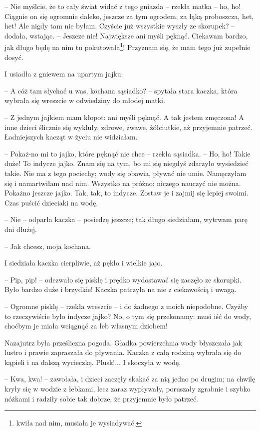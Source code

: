 \documentclass{book}
\begin{document}
-- Nie myślcie, że to cały świat widać z tego gniazda -- rzekła matka -- ho, ho! Ciągnie on się ogromnie daleko, jeszcze za tym ogrodem, za łąką proboszcza, het, het! Ale nigdy tam nie byłam. Czyście już wszystkie wyszły ze skorupek? -- dodała, wstając. -- Jeszcze nie! Największe ani myśli pęknąć. Ciekawam bardzo, jak długo będę na nim tu pokutowała\footnote{kwiła nad nim, musiała je wysiadywać.}! Przyznam się, że mam tego już zupełnie dosyć.

I usiadła z gniewem na upartym jajku.

-- A cóż tam słychać u was, kochana sąsiadko? -- spytała stara kaczka, która wybrała się wreszcie w odwiedziny do młodej matki.

-- Z jednym jajkiem mam kłopot: ani myśli pęknąć. A tak jestem zmęczona! A inne dzieci ślicznie się wykluły, zdrowe, żwawe, żółciutkie, aż przyjemnie patrzeć. Ładniejszych kacząt w życiu nie widziałam.

-- Pokaż-no mi to jajko, które pęknąć nie chce -- rzekła sąsiadka. -- Ho, ho! Takie duże! To indycze jajko. Znam się na tym, bo mi się niegdyś zdarzyło wysiedzieć takie. Nie ma z tego pociechy; wody się obawia, pływać nie umie. Namęczyłam się i namartwiłam nad nim. Wszystko na próżno: niczego nauczyć nie można. Pokażno jeszcze jajko. Tak, tak, to indycze. Zostaw je i zajmij się lepiej swoimi. Czas puścić dzieciaki na wodę.

-- Nie -- odparła kaczka -- posiedzę jeszcze; tak długo siedziałam, wytrwam parę dni dłużej.

-- Jak chcesz, moja kochana.

I siedziała kaczka cierpliwie, aż pękło i wielkie jajo.

-- Pip, pip! -- odezwało się pisklę i prędko wydostawać się zaczęło ze skorupki. Było bardzo duże i brzydkie! Kaczka patrzyła na nie z ciekawością i uwagą.

-- Ogromne pisklę -- rzekła wreszcie -- i do żadnego z moich niepodobne. Czyżby to rzeczywiście było indycze jajko? No, o tym się przekonamy: musi iść do wody, choćbym je miała wciągnąć za łeb własnym dziobem!

Nazajutrz była prześliczna pogoda. Gładka powierzchnia wody błyszczała jak lustro i prawie zapraszała do pływania. Kaczka z całą rodziną wybrała się do kąpieli i na dalszą wycieczkę. Plusk!... I skoczyła w wodę.

-- Kwa, kwa! -- zawołała, i dzieci zaczęły skakać za nią jedno po drugim; na chwilę kryły się w wodzie z łebkami, lecz zaraz wypływały, poruszały zgrabnie i szybko nóżkami i radziły sobie tak dobrze, że przyjemnie było patrzeć.
\end{document}
